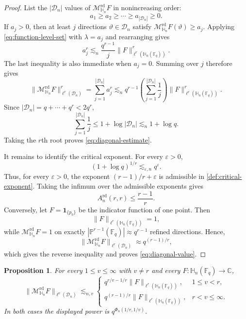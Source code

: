 \documentclass[11pt,letterpaper]{amsart}
\numberwithin{equation}{section}
\newtheorem{proposition}[proposition]{Proposition}
\theoremstyle{definition}
\theoremstyle{remark}
\newcommand{\Fq}{\mathbb F_q}
\newcommand{\C}{\mathbb C}
\newcommand{\PP}{\mathbb P}
\newcommand{\HH}{\mathbb H}
\newcommand{\Dn}{\mathcal D_n}
\newcommand{\Mrd}{\mathcal M^{\mathrm{rd}}_{\HH_n}}
\newcommand{\one}{\mathbf 1}
\newcommand{\norm}[1]{\lVert #1\rVert}
\begin{document}
\begin{proof}
List the $|\Dn|$ values of $\Mrd F$ in nonincreasing order:
\[
 a_1\geq a_2\geq\cdots\geq a_{|\Dn|}\geq0.
\]
If $a_j>0$, then at least $j$ directions $\vartheta\in\Dn$ satisfy
$\Mrd F(\vartheta)\geq a_j$.  Applying
\eqref{eq:function-level-set} with $\lambda=a_j$ and rearranging gives
\[
 a_j^r
 \lesssim_n
 \frac{q^{r-1}}{j}
 \norm{F}_{\ell^r(\HH_n(\Fq))}^r.
\]
The last inequality is also immediate when $a_j=0$. Summing over $j$
therefore gives
\[
 \norm{\Mrd F}_{\ell^r(\Dn)}^r
 =
 \sum_{j=1}^{|\Dn|}a_j^r
 \lesssim_n
 q^{r-1}
 \left(\sum_{j=1}^{|\Dn|}\frac1j\right)
 \norm{F}_{\ell^r(\HH_n(\Fq))}^r.
\]
Since $|\Dn|=q+\cdots+q^r<2q^r$,
\[
 \sum_{j=1}^{|\Dn|}\frac1j
 \leq 1+\log|\Dn|
 \lesssim_n
 1+\log q.
\]
Taking the $r$th root proves \eqref{eq:diagonal-estimate}.

It remains to identify the critical exponent. For every $\varepsilon>0$,
\[
 (1+\log q)^{1/r}\lesssim_{\varepsilon,n}q^\varepsilon.
\]
Thus, for every $\varepsilon>0$, the exponent $(r-1)/r+\varepsilon$ is admissible in \cref{def:critical-exponent}. Taking the infimum over the admissible exponents gives
\[
 A_n^{\mathrm{rd}}(r,r)
 \leq
 \frac{r-1}{r}.
\]
Conversely, let $F=\one_{\{p_0\}}$ be the indicator function of one point. Then
\[
 \norm{F}_{\ell^r(\HH_n(\Fq))}=1,
\]
while $\Mrd F=1$ on exactly
$|\PP^{r-1}(\Fq)|\approx q^{r-1}$ refined directions. Hence,
\[
 \norm{\Mrd F}_{\ell^r(\Dn)}
 \approx
 q^{(r-1)/r},
\]
which gives the reverse inequality and proves \eqref{eq:diagonal-value}.
\end{proof}


\begin{proposition}
\label{prop:critical-input-line}
For every $1\leq v\leq\infty$ with $v\neq r$ and every
$F:\HH_n(\Fq)\to\C$,
\begin{equation}\label{eq:critical-input-line}
 \norm{\Mrd F}_{\ell^v(\Dn)}
 \lesssim_{n,v}
 \begin{cases}
  q^{r/v-1/r}\norm{F}_{\ell^r(\HH_n(\Fq))},
    &1\leq v<r,\\[2mm]
  q^{(r-1)/r}\norm{F}_{\ell^r(\HH_n(\Fq))},
    &r<v\leq\infty.
 \end{cases}
\end{equation}
In both cases the displayed power is $q^{\Phi_n(1/r,1/v)}$.
\end{proposition}
\end{document}
